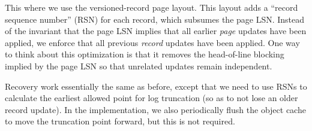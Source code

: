 \documentclass[letterpaper,twocolumn,english]{article}
\newcommand{\yad}{Lemon\xspace}
\begin{document}
This where we use the versioned-record page layout. This layout adds a
``record sequence number'' (RSN) for each record, which subsumes the
page LSN.  Instead of the invariant that the page LSN implies that all
earlier {\em page} updates have been applied, we enforce that all
previous {\em record} updates have been applied.  One way to think about
this optimization is that it removes the head-of-line blocking implied
by the page LSN so that unrelated updates remain independent.

Recovery work essentially the same as before, except that we need to
use RSNs to calculate the earliest allowed point for log truncation
(so as to not lose an older record update).  In the implementation, we
also periodically flush the object cache to move the truncation point
forward, but this is not required.



\end{document}
